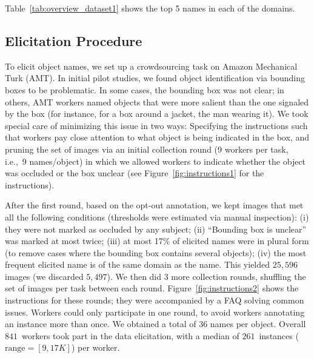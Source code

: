 Table~\ref{tab:overview_dataset1} shows the top 5 \vgenome names in each of the domains.

\subsection{Elicitation Procedure}
\label{ssec:elicitation}

To elicit object names, we set up a crowdsourcing task on Amazon Mechanical Turk (AMT).
In initial pilot studies, we found object identification via bounding boxes to be problematic.
In some cases, the bounding box was not clear; in others, AMT workers named objects that were more salient than the one signaled by the box (for instance, for a box around a jacket, the man wearing it).
We took special care of minimizing this issue in two ways: Specifying the instructions such that workers pay close attention to what object is being indicated in the box, and pruning the set of images via an initial collection round (9 workers per task, i.e.,\ 9 names/object) in which we allowed workers to indicate whether the object was occluded or the box unclear (see Figure~\ref{fig:instructions1} for the instructions).

After the first round, based on the opt-out annotation, we kept images that met all the following conditions (thresholds were estimated via manual inspection): (i) they were not marked as occluded by any subject; (ii) ``Bounding box is unclear'' was marked at most twice; (iii) at most 17\% of elicited names were in plural form (to remove cases where the bounding box contains several objects); (iv) the most frequent elicited name is of the same domain as the \vgenome name.
This yielded $25,596$ images (we discarded $5,497$).
We then did 3 more collection rounds, shuffling the set of images per task between each round.
Figure~\ref{fig:instructions2} shows the instructions for these rounds; they were accompanied by a FAQ solving common issues. 
Workers could only participate in one round, to avoid workers annotating an instance more than once. 
We obtained a total of 36 names per object.
Overall $841$\ workers took part in the data elicitation, with a median of  $261$\ instances \mbox{($\textrm{range}=[9,17K]$)} per worker.


